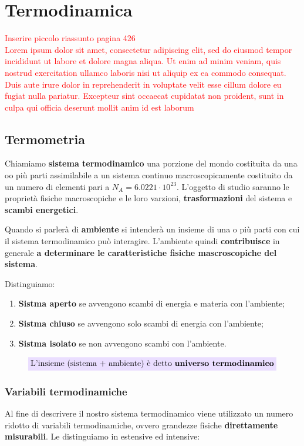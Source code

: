 \documentclass[x11names]{report}
\newcommand{\viola}[1]{\colorbox{yred}{$\displaystyle #1$}}
\begin{document}
	
	
	
	\newpage
	\chapter{Termodinamica}
	\textcolor{red}{Inserire piccolo riassunto pagina 426}\\
	
	\textcolor{red}{Lorem ipsum dolor sit amet, consectetur adipiscing elit, sed do eiusmod tempor incididunt ut labore et dolore magna aliqua. Ut enim ad minim veniam, quis nostrud exercitation ullamco laboris nisi ut aliquip ex ea commodo consequat. Duis aute irure dolor in reprehenderit in voluptate velit esse cillum dolore eu fugiat nulla pariatur. Excepteur sint occaecat cupidatat non proident, sunt in culpa qui officia deserunt mollit anim id est laborum}
	
	
	\section{Termometria}
	Chiamiamo \textbf{sistema termodinamico} una porzione del mondo costituita da una oo più parti assimilabile a un sistema continuo macroscopicamente costituito da un numero di elementi pari a \(N_A = 6.0221 \cdot 10^{23}\). L'oggetto di studio saranno le proprietà fisiche macroscopiche e le loro varzioni, \textbf{trasformazioni} del sistema e \textbf{scambi energetici}.
	
	Quando si parlerà di \textbf{ambiente} si intenderà un insieme di una o più parti con cui il sistema termodinamico può interagire. L'ambiente quindi \textbf{contribuisce} in generale \textbf{a determinare le caratteristiche fisiche mascroscopiche del sistema}.
	
	Distinguiamo:
	\begin{enumerate}
		\item \textbf{Sistma aperto} se avvengono scambi di energia e materia con l'ambiente;
		\item \textbf{Sistma chiuso} se avvengono solo scambi di energia con l'ambiente;
		\item \textbf{Sistma isolato} se non avvengono scambi con l'ambiente.
	\end{enumerate}
	
	\[ 
	\viola{\text{{L'insieme (sistema + ambiente) è detto \textbf{universo termodinamico}}}}
	\]
	\subsection{Variabili termodinamiche}
	Al fine di descrivere il nostro sistema termodinamico viene utilizzato un numero ridotto di variabili termodinamiche, ovvero grandezze fisiche \textbf{direttamente misurabili}. Le distinguiamo in estensive ed intensive:
	
\end{document}
